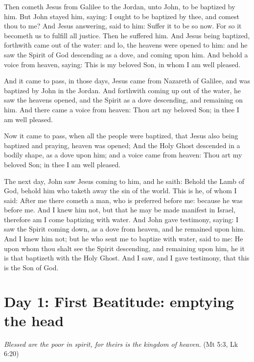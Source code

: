 \begin{quotex}
Then cometh Jesus from Galilee to the Jordan, unto John, to be baptized by him. But John stayed him, saying: I ought to be baptized by thee, and comest thou to me? And Jesus answering, said to him: Suffer it to be so now. For so it becometh us to fulfill all justice. Then he suffered him. And Jesus being baptized, forthwith came out of the water: and lo, the heavens were opened to him: and he saw the Spirit of God descending as a dove, and coming upon him. And behold a voice from heaven, saying: This is my beloved Son, in whom I am well pleased. 

And it came to pass, in those days, Jesus came from Nazareth of Galilee, and was baptized by John in the Jordan. And forthwith coming up out of the water, he saw the heavens opened, and the Spirit as a dove descending, and remaining on him. And there came a voice from heaven: Thou art my beloved Son; in thee I am well pleased. 

Now it came to pass, when all the people were baptized, that Jesus also being baptized and praying, heaven was opened; And the Holy Ghost descended in a bodily shape, as a dove upon him; and a voice came from heaven: Thou art my beloved Son; in thee I am well pleased. 

The next day, John saw Jesus coming to him, and he saith: Behold the Lamb of God, behold him who taketh away the sin of the world. This is he, of whom I said: After me there cometh a man, who is preferred before me: because he was before me. And I knew him not, but that he may be made manifest in Israel, therefore am I come baptizing with water. And John gave testimony, saying: I saw the Spirit coming down, as a dove from heaven, and he remained upon him. And I knew him not; but he who sent me to baptize with water, said to me: He upon whom thou shalt see the Spirit descending, and remaining upon him, he it is that baptizeth with the Holy Ghost. And I saw, and I gave testimony, that this is the Son of God. 
\end{quotex}

\section{Day 1: First Beatitude: emptying the head}
\emph{Blessed are the poor in spirit, for theirs is the kingdom of heaven}. (Mt 5:3, Lk 6:20)

